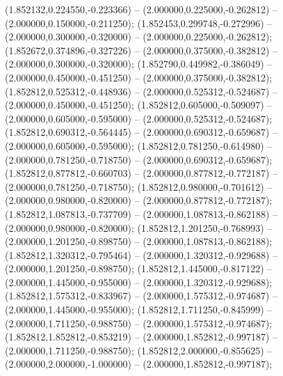  (1.852132,0.224550,-0.223366) -- (2.000000,0.225000,-0.262812) -- (2.000000,0.150000,-0.211250);
 (1.852453,0.299748,-0.272996) -- (2.000000,0.300000,-0.320000) -- (2.000000,0.225000,-0.262812);
 (1.852672,0.374896,-0.327226) -- (2.000000,0.375000,-0.382812) -- (2.000000,0.300000,-0.320000);
 (1.852790,0.449982,-0.386049) -- (2.000000,0.450000,-0.451250) -- (2.000000,0.375000,-0.382812);
 (1.852812,0.525312,-0.448936) -- (2.000000,0.525312,-0.524687) -- (2.000000,0.450000,-0.451250);
 (1.852812,0.605000,-0.509097) -- (2.000000,0.605000,-0.595000) -- (2.000000,0.525312,-0.524687);
 (1.852812,0.690312,-0.564445) -- (2.000000,0.690312,-0.659687) -- (2.000000,0.605000,-0.595000);
 (1.852812,0.781250,-0.614980) -- (2.000000,0.781250,-0.718750) -- (2.000000,0.690312,-0.659687);
 (1.852812,0.877812,-0.660703) -- (2.000000,0.877812,-0.772187) -- (2.000000,0.781250,-0.718750);
 (1.852812,0.980000,-0.701612) -- (2.000000,0.980000,-0.820000) -- (2.000000,0.877812,-0.772187);
 (1.852812,1.087813,-0.737709) -- (2.000000,1.087813,-0.862188) -- (2.000000,0.980000,-0.820000);
 (1.852812,1.201250,-0.768993) -- (2.000000,1.201250,-0.898750) -- (2.000000,1.087813,-0.862188);
 (1.852812,1.320312,-0.795464) -- (2.000000,1.320312,-0.929688) -- (2.000000,1.201250,-0.898750);
 (1.852812,1.445000,-0.817122) -- (2.000000,1.445000,-0.955000) -- (2.000000,1.320312,-0.929688);
 (1.852812,1.575312,-0.833967) -- (2.000000,1.575312,-0.974687) -- (2.000000,1.445000,-0.955000);
 (1.852812,1.711250,-0.845999) -- (2.000000,1.711250,-0.988750) -- (2.000000,1.575312,-0.974687);
 (1.852812,1.852812,-0.853219) -- (2.000000,1.852812,-0.997187) -- (2.000000,1.711250,-0.988750);
 (1.852812,2.000000,-0.855625) -- (2.000000,2.000000,-1.000000) -- (2.000000,1.852812,-0.997187);
